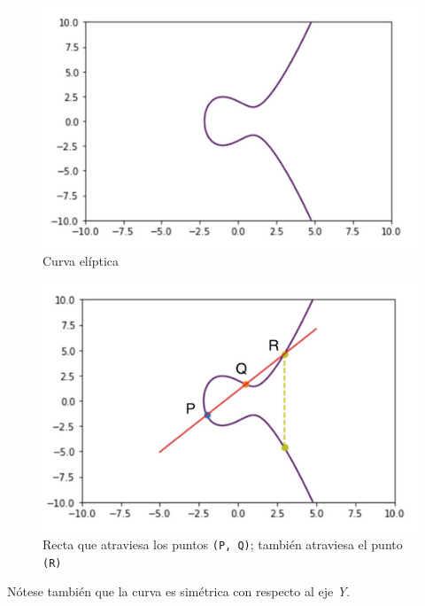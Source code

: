 \begin{multicols}{2}

    \begin{figure}[H]
        \centering
        \includegraphics[width=\linewidth]{images/hackernoon-ecc-1.png}
        \caption*{Curva elíptica \autocite{HackernoonECC}}
    \end{figure}

    \begin{figure}[H]
        \centering
        \includegraphics[width=\linewidth]{images/hackernoon-ecc-2.png}
        \caption*{Recta que atraviesa los puntos \texttt{(P, Q)}; también atraviesa el punto \texttt{(R)} \autocite{HackernoonECC}}
    \end{figure}
    
\end{multicols}

Nótese también que la curva es simétrica con respecto al eje \emph{Y}.


